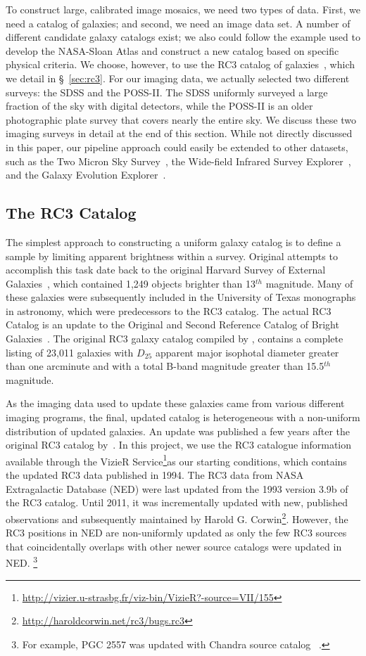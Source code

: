 \documentclass[authoryear, 12pt, 5p, times]{elsarticle}
\begin{document}
To construct large, calibrated image mosaics, we need two types of data. First, we need a catalog of galaxies; and second, we need an image data set. A number of different candidate galaxy catalogs exist; we also could follow the example used to develop the NASA-Sloan Atlas and construct a new catalog based on specific physical criteria. We choose, however, to use the RC3 catalog of galaxies~\citep{rc3}, which we detail in \S~\ref{sec:rc3}. For our imaging data, we actually selected two different surveys: the SDSS and the POSS-II. The SDSS uniformly surveyed a large fraction of the sky with digital detectors, while the POSS-II is an older photographic plate survey that covers nearly the entire sky. We discuss these two imaging surveys in detail at the end of this section. While not directly discussed in this paper, our pipeline approach could easily be extended to other datasets, such as the Two Micron Sky Survey~\citep{2mass}, the Wide-field Infrared Survey Explorer~\citep{wise}, and the Galaxy Evolution Explorer~\citep{galex}.

\subsection{The RC3 Catalog\label{sec:rc3}}

The simplest approach to constructing a uniform galaxy catalog is to  define a sample by limiting apparent brightness within a survey. Original attempts to accomplish this task date back to the original Harvard Survey of External Galaxies~\citep{shapley-ames}, which contained 1,249 objects brighter than 13$^{th}$ magnitude. Many of these galaxies were subsequently included in the University of Texas monographs in astronomy, which were predecessors to the RC3 catalog. The actual RC3 Catalog is an update to the Original and Second Reference Catalog of Bright Galaxies~\citep{rc2}. The original RC3 galaxy catalog compiled by \citet{rc3}, contains a  complete listing of 23,011 galaxies with $D_{25}$ apparent major isophotal diameter greater than one arcminute and with a total B-band magnitude greater than 15.5$^{th}$ magnitude. 

As the imaging data used to update these galaxies  came from various different imaging programs, the final, updated catalog is heterogeneous with a non-uniform distribution of updated galaxies. An update was published a few years after the original RC3 catalog by~\citet{rc3-94}. In this project, we use the RC3 catalogue information available through the VizieR Service\footnote{\url{http://vizier.u-strasbg.fr/viz-bin/VizieR?-source=VII/155}}as our starting conditions,  which contains the updated RC3 data published in 1994. The RC3 data from  NASA Extragalactic Database (NED) were last updated from the 1993 version 3.9b of the RC3 catalog. Until 2011, it was incrementally updated with new, published observations and subsequently maintained by Harold G. Corwin\footnote{\url{http://haroldcorwin.net/rc3/bugs.rc3}}. However, the RC3 positions in NED are non-uniformly updated as only the few RC3 sources that coincidentally overlaps with other newer source catalogs were updated in NED. \footnote{For example, PGC 2557 was updated with Chandra source catalog ~\citep{chandra}.} 
\end{document}

